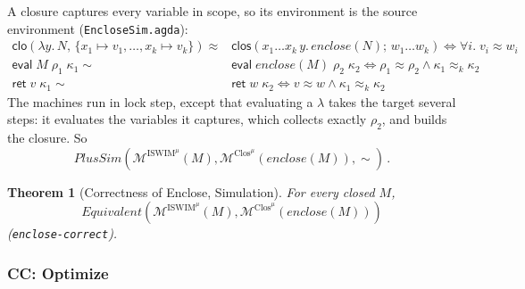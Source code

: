 \documentclass[10pt]{article}
\theoremstyle{acmplain}
\newtheorem{theorem}{Theorem}[section]
\newcommand{\key}[1]{\mathsf{#1}}
\newcommand{\pass}[1]{\mathit{#1}}
\newcommand{\lam}[1]{\lambda #1.\,}
\newcommand{\ev}[3]{\key{eval}\;#1\;#2\;#3}
\newcommand{\rt}[2]{\key{ret}\;#1\;#2}
\newcommand{\Mach}[1]{\mathcal{M}^{#1}}
\newcommand{\Equiv}{\mathit{Equivalent}}
\newcommand{\cloV}[2]{\key{clo}(#1,\, #2)}
\newcommand{\closV}[2]{\key{clos}(#1;\, #2)}
\newcommand{\approxk}{\approx_k}
\newcommand{\Ml}[1]{\textrm{#1}^{\mu}}                  %
\begin{document}
A closure captures every variable in scope, so its environment is the
source environment (\texttt{EncloseSim.agda}):
\begin{align*}
  \cloV{\lam{y} N}{\{x_1 {\mapsto} v_1, \ldots, x_k {\mapsto} v_k\}} \approx {}&
    \closV{x_1 \ldots x_k\, y.\, \pass{enclose}(N)}{w_1 \ldots w_k}
    \iff \forall i.\; v_i \approx w_i \\
  \ev{M}{\rho_1}{\kappa_1} \sim {}& \ev{\pass{enclose}(M)}{\rho_2}{\kappa_2}
    \iff \rho_1 \approx \rho_2 \land \kappa_1 \approxk \kappa_2 \\
  \rt{v}{\kappa_1} \sim {}& \rt{w}{\kappa_2} \iff v \approx w \land \kappa_1 \approxk \kappa_2
\end{align*}
The machines run in lock step, except that evaluating a $\lambda$ takes the
target several steps: it evaluates the variables it captures, which
collects exactly $\rho_2$, and builds the closure. So
\[ \mathit{PlusSim}(\Mach{\Ml{ISWIM}}(M), \Mach{\Ml{Clos}}(\pass{enclose}(M)), \sim)\,. \]
\begin{theorem}[Correctness of Enclose, Simulation]\label{thm:m-cek-enclose}
For every closed $M$,
\[ \Equiv(\Mach{\Ml{ISWIM}}(M), \Mach{\Ml{Clos}}(\pass{enclose}(M))) \]
(\texttt{enclose-correct}).
\end{theorem}

\subsubsection{CC: Optimize}
\end{document}
